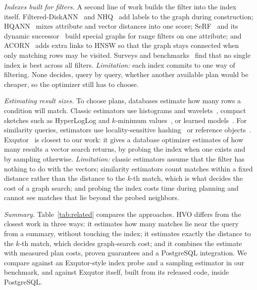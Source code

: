 \documentclass[sigconf,nonacm]{acmart}
\begin{document}
\emph{Indexes built for filters.} A second line of work builds the filter into the index itself. Filtered-DiskANN~\cite{gollapudi2023filtereddiskann} and NHQ~\cite{wang2022nhq} add labels to the graph during construction; HQANN~\cite{wu2022hqann} mixes attribute and vector distances into one score; SeRF~\cite{zuo2024serf} and its dynamic successor~\cite{peng2025drfanns} build special graphs for range filters on one attribute; and ACORN~\cite{patel2024acorn} adds extra links to HNSW so that the graph stays connected when only matching rows may be visited. Surveys and benchmarks~\cite{lin2025survey,iff2025benchmark,shi2025unified,amanbayev2026fanns} find that no single index is best across all filters. \emph{Limitation:} each index commits to one way of filtering. None decides, query by query, whether another available plan would be cheaper, so the optimizer still has to choose.

\emph{Estimating result sizes.} To choose plans, databases estimate how many rows a condition will match. Classic estimators use histograms and wavelets~\cite{matias1998wavelet,gunopulos2000approximating}, compact sketches such as HyperLogLog and $k$-minimum values~\cite{flajolet2007hll,beyer2007kmv}, or learned models~\cite{kipf2019mscn,yang2020neurocard,hilprecht2020deepdb}. For similarity queries, estimators use locality-sensitive hashing~\cite{charikar2002similarity,spring2017new} or reference objects~\cite{lan2024cardinality}. Exqutor~\cite{exqutor2026} is closest to our work: it gives a database optimizer estimates of how many results a vector search returns, by probing the index when one exists and by sampling otherwise. \emph{Limitation:} classic estimators assume that the filter has nothing to do with the vectors; similarity estimators count matches within a fixed distance rather than the distance to the $k$-th match, which is what decides the cost of a graph search; and probing the index costs time during planning and cannot see matches that lie beyond the probed neighbors.

\emph{Summary.} Table~\ref{tab:related} compares the approaches. HVO differs from the closest work in three ways: it estimates how many matches lie near the query from a summary, without touching the index; it estimates exactly the distance to the $k$-th match, which decides graph-search cost; and it combines the estimate with measured plan costs, proven guarantees and a PostgreSQL integration. We compare against an Exqutor-style index probe and a sampling estimator in our benchmark, and against Exqutor itself, built from its released code, inside PostgreSQL.
\end{document}
